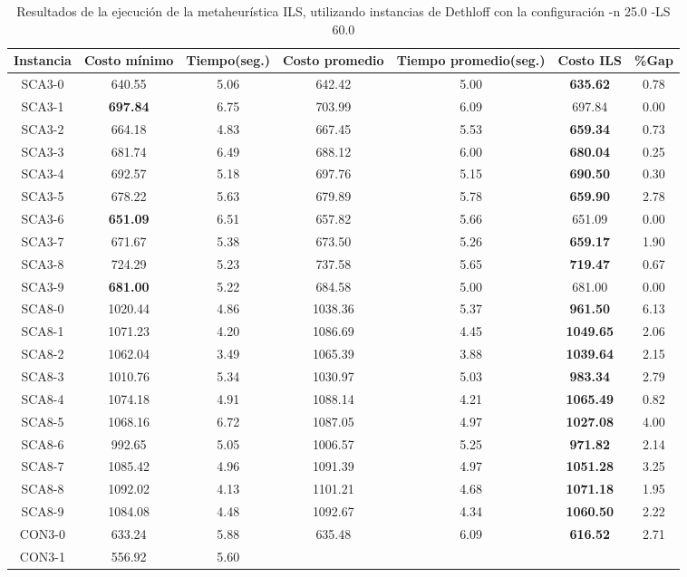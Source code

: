 \begin{table}[ht]
\caption{Resultados de la ejecución de la metaheurística ILS, utilizando instancias de Dethloff con la configuración -n 25.0 -LS 60.0}
\centering
\small
\begin{tabular}{c c c c c c c}
\hline\hline
Instancia & Costo mínimo & Tiempo(seg.) & Costo promedio & Tiempo promedio(seg.) & Costo ILS & \%Gap \\ [0.5ex]
\hline
SCA3-0 & 640.55 & 5.06 & 
642.42 & 5.00 & \bf{635.62} & 
0.78\\SCA3-1 & \bf{697.84} & 6.75 & 
703.99 & 6.09 & 697.84 & 0.00\\
SCA3-2 & 664.18 & 4.83 & 
667.45 & 5.53 & \bf{659.34} & 
0.73\\SCA3-3 & 681.74 & 6.49 & 
688.12 & 6.00 & \bf{680.04} & 
0.25\\SCA3-4 & 692.57 & 5.18 & 
697.76 & 5.15 & \bf{690.50} & 
0.30\\SCA3-5 & 678.22 & 5.63 & 
679.89 & 5.78 & \bf{659.90} & 
2.78\\SCA3-6 & \bf{651.09} & 6.51 & 
657.82 & 5.66 & 651.09 & 0.00\\
SCA3-7 & 671.67 & 5.38 & 
673.50 & 5.26 & \bf{659.17} & 
1.90\\SCA3-8 & 724.29 & 5.23 & 
737.58 & 5.65 & \bf{719.47} & 
0.67\\SCA3-9 & \bf{681.00} & 5.22 & 
684.58 & 5.00 & 681.00 & 0.00\\
SCA8-0 & 1020.44 & 4.86 & 
1038.36 & 5.37 & \bf{961.50} & 
6.13\\SCA8-1 & 1071.23 & 4.20 & 
1086.69 & 4.45 & \bf{1049.65} & 
2.06\\SCA8-2 & 1062.04 & 3.49 & 
1065.39 & 3.88 & \bf{1039.64} & 
2.15\\SCA8-3 & 1010.76 & 5.34 & 
1030.97 & 5.03 & \bf{983.34} & 
2.79\\SCA8-4 & 1074.18 & 4.91 & 
1088.14 & 4.21 & \bf{1065.49} & 
0.82\\SCA8-5 & 1068.16 & 6.72 & 
1087.05 & 4.97 & \bf{1027.08} & 
4.00\\SCA8-6 & 992.65 & 5.05 & 
1006.57 & 5.25 & \bf{971.82} & 
2.14\\SCA8-7 & 1085.42 & 4.96 & 
1091.39 & 4.97 & \bf{1051.28} & 
3.25\\SCA8-8 & 1092.02 & 4.13 & 
1101.21 & 4.68 & \bf{1071.18} & 
1.95\\SCA8-9 & 1084.08 & 4.48 & 
1092.67 & 4.34 & \bf{1060.50} & 
2.22\\CON3-0 & 633.24 & 5.88 & 
635.48 & 6.09 & \bf{616.52} & 
2.71\\CON3-1 & 556.92 & 5.60 & 

\end{tabular}
\end{table}
